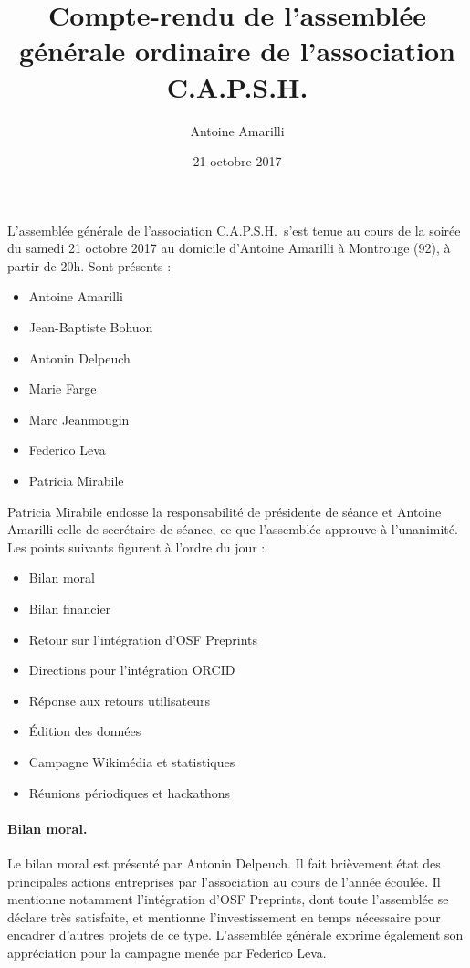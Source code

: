 \documentclass{scrartcl}
\title{Compte-rendu de l'assemblée générale ordinaire de l'association C.A.P.S.H.}
\author{Antoine Amarilli}
\date{21 octobre 2017}
\begin{document}
\maketitle

L'assemblée générale de l'association C.A.P.S.H.\ s'est tenue au cours de la
soirée du samedi 21 octobre 2017 au domicile d'Antoine Amarilli à Montrouge
(92), à partir de 20h.
% 
Sont présents :

\medskip

\begin{itemize}
\item Antoine Amarilli
\item Jean-Baptiste Bohuon
\item Antonin Delpeuch
\item Marie Farge
\item Marc Jeanmougin
\item Federico Leva
\item Patricia Mirabile
\end{itemize}

\medskip

Patricia Mirabile endosse la responsabilité de présidente de séance et Antoine
Amarilli celle de secrétaire de séance, ce que l'assemblée approuve à l'unanimité.
Les points suivants figurent à l'ordre
du jour :

\medskip

\begin{itemize}
\item Bilan moral
\item Bilan financier
\item Retour sur l'intégration d'OSF Preprints
\item Directions pour l'intégration ORCID
\item Réponse aux retours utilisateurs
\item Édition des données
\item Campagne Wikimédia et statistiques
\item Réunions périodiques et hackathons
\end{itemize}

\paragraph{Bilan moral.} Le bilan moral est présenté par Antonin Delpeuch. Il
fait brièvement état des principales actions entreprises par l'association au
cours de l'année écoulée. Il mentionne notamment l'intégration d'OSF Preprints,
dont toute l'assemblée se déclare très satisfaite, et mentionne l'investissement en temps
nécessaire pour encadrer d'autres projets de ce type.  L'assemblée générale
exprime également son appréciation pour la campagne menée par Federico Leva.
\end{document}

